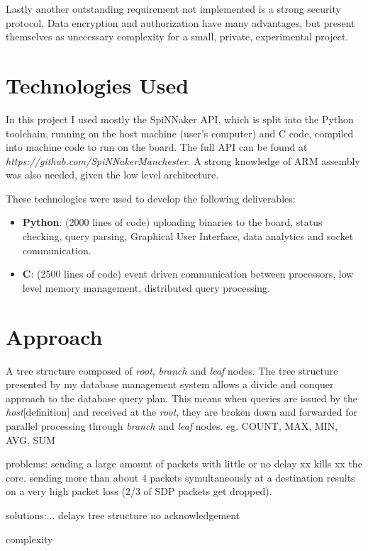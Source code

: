 Lastly another outstanding requirement not implemented is a strong security protocol. Data encryption and authorization have many advantages, but present themselves as unecessary complexity for a small, private, experimental project.

\section{Technologies Used}
In this project I used mostly the SpiNNaker API, which is split into the Python toolchain, running on the host machine (user's computer) and C code, compiled into machine code to run on the board.
The full API can be found at \textit{https://github.com/SpiNNakerManchester}. A strong knowledge of ARM assembly was also needed, given the low level architecture.
 
These technologies were used to develop the following deliverables:
\begin{itemize}
	\item \textbf{Python}: (2000 lines of code) uploading binaries to the board, status checking, query parsing, Graphical User Interface, data analytics and socket communication.
	\item \textbf{C}: (2500 lines of code) event driven communication between processors, low level memory management, distributed query processing.
\end{itemize}

\section{Approach}

A tree structure composed of \textit{root}, \textit{branch} and \textit{leaf} nodes. The tree structure presented by my database management system allows a divide and conquer approach to the database query plan. This means when queries are issued by the \textit{host}[definition] and received at the \textit{root}, they are broken down and forwarded for parallel processing through \textit{branch} and \textit{leaf} nodes. eg. COUNT, MAX, MIN, AVG, SUM

problems:
sending a large amount of packets with little or no delay xx kills xx the core. sending more than about 4 packets symultaneously at a destination results on a very high packet loss (2/3 of SDP packets get dropped).


solutions:...
delays
tree structure
no acknowledgement


complexity


